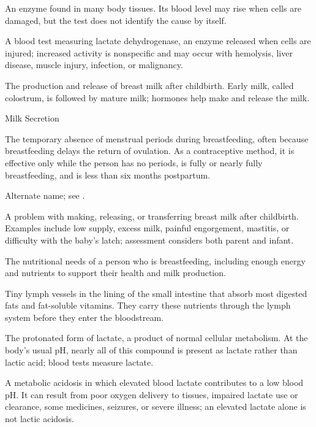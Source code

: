  An enzyme found in many body tissues. Its blood level may rise when cells are damaged, but the test does not identify the cause by itself.

 A blood test measuring lactate dehydrogenase, an enzyme released when cells are injured; increased activity is nonspecific and may occur with hemolysis, liver disease, muscle injury, infection, or malignancy.

 The production and release of breast milk after childbirth. Early milk, called colostrum, is followed by mature milk; hormones help make and release the milk.

\synonyms
Milk Secretion

 The temporary absence of menstrual periods during breastfeeding, often because breastfeeding delays the return of ovulation. As a contraceptive method, it is effective only while the person has no periods, is fully or nearly fully breastfeeding, and is less than six months postpartum.

 Alternate name; see .

 A problem with making, releasing, or transferring breast milk after childbirth. Examples include low supply, excess milk, painful engorgement, mastitis, or difficulty with the baby’s latch; assessment considers both parent and infant.

 The nutritional needs of a person who is breastfeeding, including enough energy and nutrients to support their health and milk production.

 Tiny lymph vessels in the lining of the small intestine that absorb most digested fats and fat-soluble vitamins. They carry these nutrients through the lymph system before they enter the bloodstream.

 The protonated form of lactate, a product of normal cellular metabolism. At the body's usual pH, nearly all of this compound is present as lactate rather than lactic acid; blood tests measure lactate.

 A metabolic acidosis in which elevated blood lactate contributes to a low blood pH. It can result from poor oxygen delivery to tissues, impaired lactate use or clearance, some medicines, seizures, or severe illness; an elevated lactate alone is not lactic acidosis.

